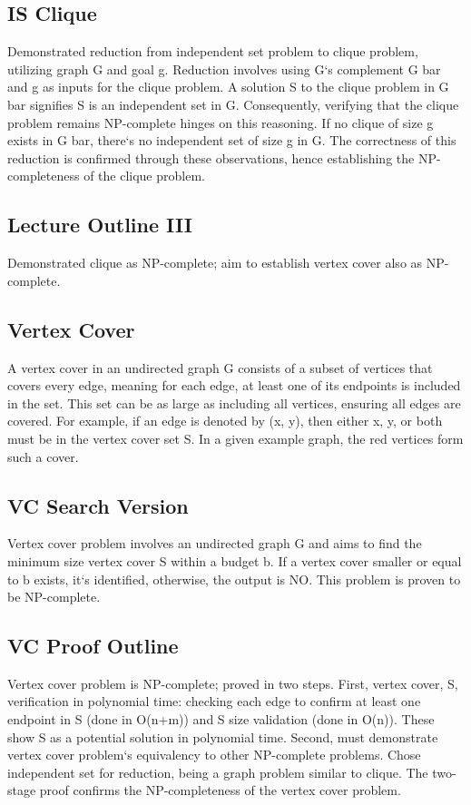 \subsection*{IS Clique}
Demonstrated reduction from independent set problem to clique problem, utilizing graph G and goal g.
Reduction involves using G`s complement G bar and g as inputs for the clique problem.
A solution S to the clique problem in G bar signifies S is an independent set in G\@.
Consequently, verifying that the clique problem remains NP-complete hinges on this reasoning.
If no clique of size g exists in G bar, there`s no independent set of size g in G\@.
The correctness of this reduction is confirmed through these observations, hence establishing the NP-completeness of the clique problem.

\subsection*{Lecture Outline III}
Demonstrated clique as NP-complete; aim to establish vertex cover also as NP-complete.

\subsection*{Vertex Cover}
A vertex cover in an undirected graph G consists of a subset of vertices that covers every edge, meaning for each edge, at least one of its endpoints is included in the set.
This set can be as large as including all vertices, ensuring all edges are covered.
For example, if an edge is denoted by (x, y), then either x, y, or both must be in the vertex cover set S\@.
In a given example graph, the red vertices form such a cover.

\subsection*{VC  Search Version}
Vertex cover problem involves an undirected graph G and aims to find the minimum size vertex cover S within a budget b.
If a vertex cover smaller or equal to b exists, it`s identified, otherwise, the output is NO\@.
This problem is proven to be NP-complete.

\subsection*{VC  Proof Outline}
Vertex cover problem is NP-complete; proved in two steps.
First, vertex cover, S, verification in polynomial time: checking each edge to confirm at least one endpoint in S (done in O(n+m)) and S size validation (done in O(n)).
These show S as a potential solution in polynomial time.
Second, must demonstrate vertex cover problem`s equivalency to other NP-complete problems.
Chose independent set for reduction, being a graph problem similar to clique.
The two-stage proof confirms the NP-completeness of the vertex cover problem.

